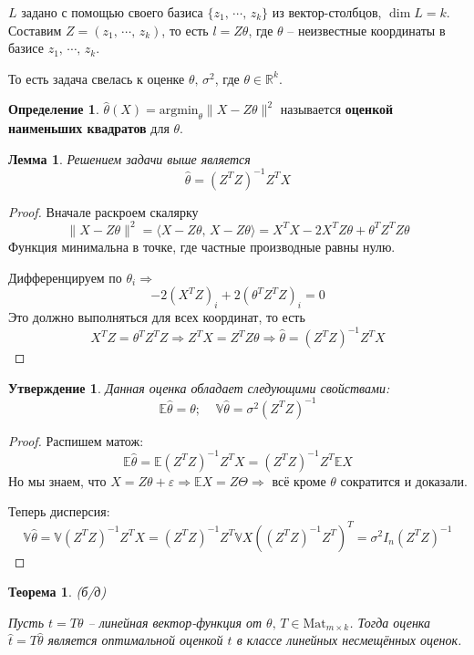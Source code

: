 \documentclass[a4paper,12pt]{article}
\theoremstyle{plain}
\newtheorem{theorem}{Теорема}[section]
\newtheorem{lemma}{Лемма}[section]
\newtheorem{proposition}{Утверждение}[section]
\theoremstyle{definition}
\newtheorem{definition}{Определение}[section]
\theoremstyle{remark}
\begin{document}
$L$ задано с помощью своего базиса $\{z_1,\,\cdots,\,z_k\}$ из вектор-столбцов, $\dim L = k$. Составим $Z = (z_1,\,\cdots,\,z_k)$, то есть $l = Z\theta$, где $\theta$ -- неизвестные координаты в базисе $z_1,\,\cdots,\,z_k$.

То есть задача свелась к оценке $\theta,\, \sigma^2$, где $\theta \in \mathbb{R}^k$.

\begin{definition}
  $\hat{\theta}(X) = \text{argmin}_\theta\|X - Z\theta\|^2$ называется \textbf{оценкой наименьших квадратов} для $\theta$.
\end{definition}

\begin{lemma}
  Решением задачи выше является
  \[
    \hat{\theta} = (Z^TZ)^{-1}Z^TX
  \]
\end{lemma}

\begin{proof}
  Вначале раскроем скалярку
  \[
    \|X - Z\theta\|^2 = \langle X - Z\theta,\, X - Z\theta\rangle = X^TX - 2X^TZ\theta + \theta^TZ^TZ\theta
  \]
  Функция минимальна в точке, где частные производные равны нулю.

  Дифференцируем по $\theta_i \Rightarrow$
  \[
    -2(X^TZ)_i + 2(\theta^TZ^TZ)_i = 0
  \]
  Это должно выполняться для всех координат, то есть
  \[
    X^TZ = \theta^TZ^TZ \Rightarrow Z^TX = Z^TZ\theta \Rightarrow \hat{\theta} = (Z^TZ)^{-1}Z^TX
  \]
\end{proof}

\begin{proposition}
  Данная оценка обладает следующими свойствами:
  \[
    \mathbb{E}\hat{\theta} = \theta;\;\;\;\; \mathbb{V}\hat{\theta} = \sigma^2(Z^TZ)^{-1}
  \]
\end{proposition}

\begin{proof}
  Распишем матож:
  \[
    \mathbb{E}\hat{\theta} = \mathbb{E}(Z^TZ)^{-1}Z^TX = (Z^TZ)^{-1}Z^T\mathbb{E}X
  \]
  Но мы знаем, что $X = Z\theta + \varepsilon \Rightarrow \mathbb{E}X = Z\Theta \Rightarrow$ всё кроме $\theta$ сократится и доказали.

  Теперь дисперсия:
  \[
    \mathbb{V}\hat{\theta} = \mathbb{V}(Z^TZ)^{-1}Z^TX = (Z^TZ)^{-1}Z^T\mathbb{V}X((Z^TZ)^{-1}Z^T)^T = \sigma^2I_n(Z^TZ)^{-1}
  \]
\end{proof}

\begin{theorem}
  (б/д)

  Пусть $t = T\theta$ -- линейная вектор-функция от $\theta,\, T \in \text{Mat}_{m \times k}$. Тогда оценка $\hat{t} = T\hat{\theta}$ является оптимальной оценкой $t$ в классе линейных несмещённых оценок.
\end{theorem}
\end{document}
